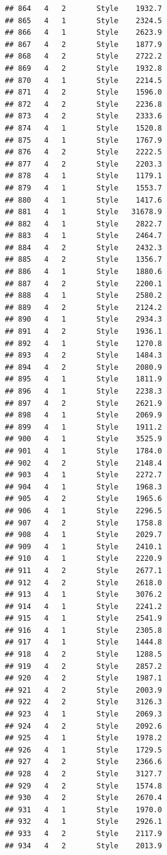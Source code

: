 \documentclass[12pt,]{krantz}
\theoremstyle{definition}
\theoremstyle{definition}
\theoremstyle{remark}
\begin{document}
\begin{verbatim}
## 864   4   2       Style    1932.7
## 865   4   1       Style    2324.5
## 866   4   1       Style    2623.9
## 867   4   2       Style    1877.9
## 868   4   2       Style    2722.2
## 869   4   2       Style    1932.8
## 870   4   1       Style    2214.5
## 871   4   2       Style    1596.0
## 872   4   2       Style    2236.8
## 873   4   2       Style    2333.6
## 874   4   1       Style    1520.8
## 875   4   1       Style    1767.9
## 876   4   2       Style    2222.5
## 877   4   2       Style    2203.3
## 878   4   1       Style    1179.1
## 879   4   1       Style    1553.7
## 880   4   1       Style    1417.6
## 881   4   1       Style   31678.9
## 882   4   1       Style    2822.7
## 883   4   1       Style    2464.7
## 884   4   2       Style    2432.3
## 885   4   2       Style    1356.7
## 886   4   1       Style    1880.6
## 887   4   2       Style    2200.1
## 888   4   1       Style    2580.2
## 889   4   2       Style    2124.2
## 890   4   1       Style    2934.3
## 891   4   2       Style    1936.1
## 892   4   1       Style    1270.8
## 893   4   2       Style    1484.3
## 894   4   2       Style    2080.9
## 895   4   1       Style    1811.9
## 896   4   1       Style    2238.3
## 897   4   2       Style    2621.9
## 898   4   1       Style    2069.9
## 899   4   1       Style    1911.2
## 900   4   1       Style    3525.9
## 901   4   1       Style    1784.0
## 902   4   2       Style    2148.4
## 903   4   1       Style    2272.7
## 904   4   1       Style    1968.3
## 905   4   2       Style    1965.6
## 906   4   1       Style    2296.5
## 907   4   2       Style    1758.8
## 908   4   1       Style    2029.7
## 909   4   1       Style    2410.1
## 910   4   1       Style    2220.9
## 911   4   2       Style    2677.1
## 912   4   2       Style    2618.0
## 913   4   1       Style    3076.2
## 914   4   1       Style    2241.2
## 915   4   1       Style    2541.9
## 916   4   1       Style    2305.8
## 917   4   1       Style    1444.8
## 918   4   2       Style    1288.5
## 919   4   2       Style    2857.2
## 920   4   2       Style    1987.1
## 921   4   2       Style    2003.9
## 922   4   2       Style    3126.3
## 923   4   1       Style    2069.3
## 924   4   2       Style    2092.6
## 925   4   1       Style    1978.2
## 926   4   1       Style    1729.5
## 927   4   2       Style    2366.6
## 928   4   2       Style    3127.7
## 929   4   2       Style    1574.8
## 930   4   2       Style    2670.4
## 931   4   1       Style    1970.0
## 932   4   1       Style    2926.1
## 933   4   2       Style    2117.9
## 934   4   2       Style    2013.9

\end{verbatim}
\end{document}
